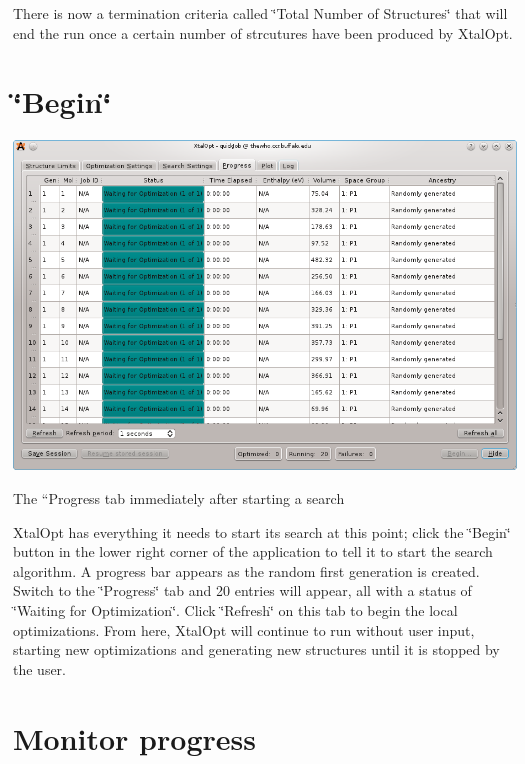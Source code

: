There is now a termination criteria called \char`\"{}\+Total Number of Structures\char`\"{} that will end the run once a certain number of strcutures have been produced by Xtal\+Opt.\hypertarget{tut-xo_begin}{}\section{\char`\"{}\+Begin\char`\"{}}\label{tut-xo_begin}

\begin{DoxyImage}
\includegraphics[width=\textwidth]{prog-start.png}
\caption{The ``\+Progress\textquotesingle{}\textquotesingle{} tab immediately after starting a search}
\end{DoxyImage}


Xtal\+Opt has everything it needs to start its search at this point; click the \char`\"{}\+Begin\char`\"{} button in the lower right corner of the application to tell it to start the search algorithm. A progress bar appears as the random first generation is created. Switch to the \char`\"{}\+Progress\char`\"{} tab and 20 entries will appear, all with a status of \char`\"{}\+Waiting for
\+Optimization\char`\"{}. Click \char`\"{}\+Refresh\char`\"{} on this tab to begin the local optimizations. From here, Xtal\+Opt will continue to run without user input, starting new optimizations and generating new structures until it is stopped by the user.\hypertarget{tut-xo_prog-mon}{}\section{Monitor progress}\label{tut-xo_prog-mon}

